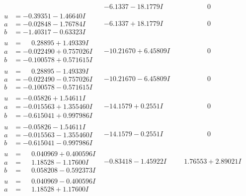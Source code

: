 \documentclass[1p]{elsarticle_modified}
\theoremstyle{definition}
\begin{document}
$$\begin{array}{c|c|c}
 & -6.1337 - 18.1779 I & \phantom{-0.000000 } 0 \\ \hline\begin{aligned}
u &= -0.39351 - 1.46640 I \\
a &= -0.02848 - 1.76784 I \\
b &= -1.40317 - 0.63323 I\end{aligned}
 & -6.1337 + 18.1779 I & \phantom{-0.000000 } 0 \\ \hline\begin{aligned}
u &= \phantom{-}0.28895 + 1.49339 I \\
a &= -0.022490 + 0.757026 I \\
b &= -0.100578 + 0.571615 I\end{aligned}
 & -10.21670 + 6.45809 I & \phantom{-0.000000 } 0 \\ \hline\begin{aligned}
u &= \phantom{-}0.28895 - 1.49339 I \\
a &= -0.022490 - 0.757026 I \\
b &= -0.100578 - 0.571615 I\end{aligned}
 & -10.21670 - 6.45809 I & \phantom{-0.000000 } 0 \\ \hline\begin{aligned}
u &= -0.05826 + 1.54611 I \\
a &= -0.015563 + 1.355460 I \\
b &= -0.615041 + 0.997986 I\end{aligned}
 & -14.1579 + 0.2551 I & \phantom{-0.000000 } 0 \\ \hline\begin{aligned}
u &= -0.05826 - 1.54611 I \\
a &= -0.015563 - 1.355460 I \\
b &= -0.615041 - 0.997986 I\end{aligned}
 & -14.1579 - 0.2551 I & \phantom{-0.000000 } 0 \\ \hline\begin{aligned}
u &= \phantom{-}0.040969 + 0.400596 I \\
a &= \phantom{-}1.18528 - 1.17600 I \\
b &= \phantom{-}0.058208 - 0.592373 I\end{aligned}
 & -0.83418 - 1.45922 I & \phantom{-}1.76553 + 2.89021 I \\ \hline\begin{aligned}
u &= \phantom{-}0.040969 - 0.400596 I \\
a &= \phantom{-}1.18528 + 1.17600 I \\

\end{aligned}
\end{array}$$
\end{document}
